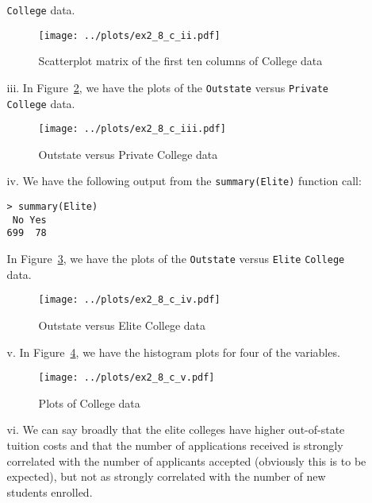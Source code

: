 \begin{itemize}
\begin{itemize}
        \verb|College| data.
        \begin{figure}[!ht]
            \texttt{[image: ../plots/ex2\_8\_c\_ii.pdf]}
            \caption{Scatterplot matrix of the first ten columns of College data \label{fig2}}
        \end{figure}
        \item[iii.] In Figure~\ref{fig3}, we have the plots of the \verb|Outstate| versus 
        \verb|Private| \verb|College| data.
        \begin{figure}[!ht]
            \texttt{[image: ../plots/ex2\_8\_c\_iii.pdf]}
            \caption{Outstate versus Private College data \label{fig3}}
        \end{figure}
        \item[iv.] We have the following output from the \verb|summary(Elite)| function call:
        \scriptsize\begin{verbatim}
> summary(Elite)
 No Yes 
699  78 
        \end{verbatim}\normalsize
        In Figure~\ref{fig4}, we have the plots of the \verb|Outstate| versus 
        \verb|Elite| \verb|College| data.
        \begin{figure}[!ht]
            \texttt{[image: ../plots/ex2\_8\_c\_iv.pdf]}
            \caption{Outstate versus Elite College data \label{fig4}}
        \end{figure}
        \item[v.] In Figure~\ref{fig5}, we have the histogram plots for four of the variables.
        \begin{figure}[!ht]
            \texttt{[image: ../plots/ex2\_8\_c\_v.pdf]}
            \caption{Plots of College data \label{fig5}}
        \end{figure}
        \item[vi.] We can say broadly that the elite colleges have higher out-of-state tuition 
        costs and that the number of applications received is strongly correlated with the
        number of applicants accepted (obviously this is to be expected), but not as strongly
        correlated with the number of new students enrolled.
    \end{itemize}
\end{itemize}
